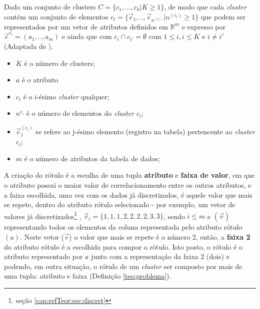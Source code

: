     \begin{teorema}
    Dado um conjunto de clusters ${C=\{c_1,...,c_k | K \geqslant 1\} }$, de modo que cada \textit{cluster} contém um conjunto de elementos ${c_i=\{\vec{e}_1,..,\vec{e}_{n^{(c_i)}}|n^{(c_i)} \geqslant 1 \}}$ que podem ser representados por um vetor de atributos definidos em ${\mathbb{R}^m }$ e expresso por ${ \vec{e}^{c_i}=(a_1,..,a_m)  }$ e ainda que  com ${ c_i \cap c_{i'}=\emptyset }$ com ${ 1 \leqslant i, i \leqslant K  }$ e ${ i \neq i' }$ (Adaptada de \cite{Lopes2016}).
        \begin{itemize}[noitemsep]
            \item ${K}$ é o número de clusters;
            \item ${a}$ é o atributo
            \item ${c_i}$ é o i-ésimo \textit{cluster} qualquer;
            \item ${n^{c_i}}$ é o número de elementos do \textit{cluster} ${c_i}$;
            \item ${\vec{e}^{(c_i)}_j}$ se refere ao j-ésimo  elemento (registro na tabela) pertencente ao \textit{cluster} ${c_i}$;
            \item ${m}$ é o número de atributos da tabela de dados;
        \end{itemize}
    \label{teo:problema}
    \end{teorema}

A criação do rótulo é a escolha de uma tupla \textbf{atributo} e \textbf{faixa de valor}, em que o atributo possui o maior valor de correlacionamento entre os outros atributos, e a faixa escolhida, uma vez com os dados já discretizados, é aquele valor que mais se repete, dentro do atributo rótulo selecionado - por exemplo, um vetor de valores já discretizados\footnote{ seção \ref{cap:refTeor:sec:discret}} , ${\vec{v}_i=\{1,1,1,2,2,2,2,3,3\}}$, sendo $i\leqslant m$ e ${(\vec{v})}$ representando todos os elementos da coluna representada pelo atributo rótulo  ${(a)}$. Neste vetor (${\vec{v}}$) o valor que mais se repete é o número 2, então, a \textbf{faixa 2} do atributo rótulo é a escolhida para compor o rótulo. Isto posto, o rótulo é o atributo representado por ${a}$ junto com a representação da faixa 2 (dois) e podendo, em outra situação, o rótulo de um \textit{cluster} ser composto por mais de uma tupla: atributo e faixa (Definição \ref{teo:problema}).



